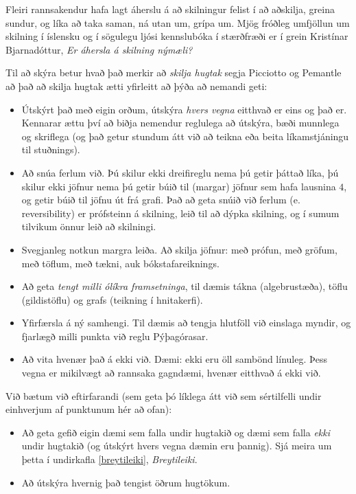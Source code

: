 \documentclass[
  icelandic,
]{book}
\providecommand{\tightlist}{%
  \setlength{\itemsep}{0pt}\setlength{\parskip}{0pt}}
\theoremstyle{definition}
\theoremstyle{definition}
\theoremstyle{definition}
\theoremstyle{definition}
\theoremstyle{remark}
\begin{document}
Fleiri rannsakendur hafa lagt áherslu á að skilningur felist í að aðskilja, greina sundur, og líka að taka saman, ná utan um, grípa um. Mjög fróðleg umfjöllun um skilning í íslensku og í sögulegu ljósi kennslubóka í stærðfræði er í grein Kristínar Bjarnadóttur, \emph{Er áhersla á skilning nýmæli?} \autocite{bjarnadottir2022}

Til að skýra betur hvað það merkir að \emph{skilja hugtak} segja Picciotto og Pemantle að það að skilja hugtak ætti yfirleitt að þýða að nemandi geti:

\begin{itemize}
\tightlist
\item
  Útskýrt það með eigin orðum, útskýra \emph{hvers vegna} eitthvað er eins og það er. Kennarar ættu því að biðja nemendur reglulega að útskýra, bæði munnlega og skriflega (og það getur stundum átt við að teikna eða beita líkamstjáningu til stuðnings).
\item
  Að snúa ferlum við. Þú skilur ekki dreifireglu nema þú getir þáttað líka, þú skilur ekki jöfnur nema þú getir búið til (margar) jöfnur sem hafa lausnina \(4\), og getir búið til jöfnu út frá grafi. Það að geta snúið við ferlum (e. reversibility) er prófsteinn á skilning, leið til að dýpka skilning, og í sumum tilvikum önnur leið að skilningi.
\item
  Svegjanleg notkun margra leiða. Að skilja jöfnur: með prófun, með gröfum, með töflum, með tækni, auk bókstafareiknings.
\item
  Að geta \emph{tengt milli ólíkra framsetninga}, til dæmis tákna (algebrustæða), töflu (gildistöflu) og grafs (teikning í hnitakerfi).
\item
  Yfirfærsla á ný samhengi. Til dæmis að tengja hlutföll við einslaga myndir, og fjarlægð milli punkta við reglu Pýþagórasar.
\item
  Að vita hvenær það á ekki við. Dæmi: ekki eru öll sambönd línuleg. Þess vegna er mikilvægt að rannsaka gagndæmi, hvenær eitthvað á ekki við.
\end{itemize}

Við bætum við eftirfarandi (sem geta þó líklega átt við sem sértilfelli undir einhverjum af punktunum hér að ofan):

\begin{itemize}
\tightlist
\item
  Að geta gefið eigin dæmi sem falla undir hugtakið og dæmi sem falla \emph{ekki} undir hugtakið (og útskýrt hvers vegna dæmin eru þannig). Sjá meira um þetta í undirkafla \ref{breytileiki}, \emph{Breytileiki}.
\item
  Að útskýra hvernig það tengist öðrum hugtökum.
\end{itemize}
\end{document}
